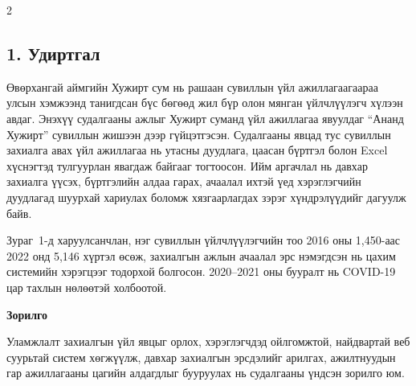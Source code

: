\begin{multicols}{2}
\setlength{\parskip}{4pt}

\subsection*{1. Удиртгал}

Өвөрхангай аймгийн Хужирт сум нь рашаан сувиллын үйл ажиллагаагаараа улсын хэмжээнд танигдсан бүс бөгөөд жил бүр олон мянган үйлчлүүлэгч хүлээн авдаг. Энэхүү судалгааны ажлыг Хужирт суманд үйл ажиллагаа явуулдаг ``Ананд Хужирт'' сувиллын жишээн дээр гүйцэтгэсэн. Судалгааны явцад тус сувиллын захиалга авах үйл ажиллагаа нь утасны дуудлага, цаасан бүртгэл болон Excel хүснэгтэд тулгуурлан явагдаж байгааг тогтоосон. Ийм аргачлал нь давхар захиалга үүсэх, бүртгэлийн алдаа гарах, ачаалал ихтэй үед хэрэглэгчийн дуудлагад шуурхай хариулах боломж хязгаарлагдах зэрэг хүндрэлүүдийг дагуулж байв.

Зураг~1-д харуулсанчлан, нэг сувиллын үйлчлүүлэгчийн тоо 2016 оны 1{,}450-аас 2022 онд 5{,}146 хүртэл өсөж, захиалгын ажлын ачаалал эрс нэмэгдсэн нь цахим системийн хэрэгцээг тодорхой болгосон. 2020--2021 оны бууралт нь COVID-19 цар тахлын нөлөөтэй холбоотой.
\begin{center}
\end{center}


\textbf{Зорилго}

Уламжлалт захиалгын үйл явцыг орлох, хэрэглэгчдэд ойлгомжтой, найдвартай веб суурьтай систем хөгжүүлж, давхар захиалгын эрсдэлийг арилгах, ажилтнуудын гар ажиллагааны цагийн алдагдлыг бууруулах нь судалгааны үндсэн зорилго юм.
\columnbreak


\end{multicols}
